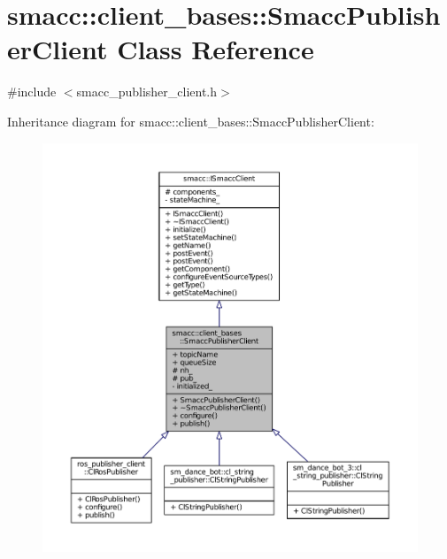 \hypertarget{classsmacc_1_1client__bases_1_1SmaccPublisherClient}{}\section{smacc\+:\+:client\+\_\+bases\+:\+:Smacc\+Publisher\+Client Class Reference}
\label{classsmacc_1_1client__bases_1_1SmaccPublisherClient}


{\ttfamily \#include $<$smacc\+\_\+publisher\+\_\+client.\+h$>$}



Inheritance diagram for smacc\+:\+:client\+\_\+bases\+:\+:Smacc\+Publisher\+Client\+:
\nopagebreak
\begin{figure}[H]
\begin{center}
\leavevmode
\includegraphics[width=350pt]{classsmacc_1_1client__bases_1_1SmaccPublisherClient__inherit__graph}
\end{center}
\end{figure}


